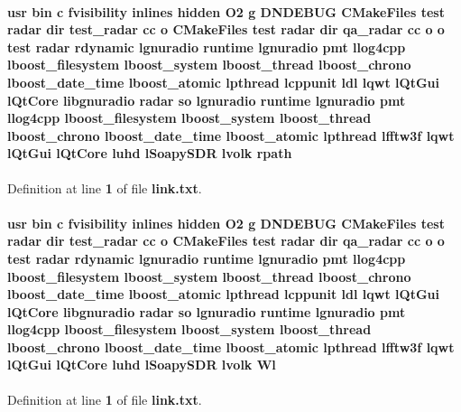 \paragraph[{rpath}]{\setlength{\rightskip}{0pt plus 5cm}usr bin {\bf c} fvisibility inlines hidden O2 g D\+N\+D\+E\+B\+UG C\+Make\+Files test {\bf radar} dir test\+\_\+radar cc o C\+Make\+Files test {\bf radar} dir {\bf qa\+\_\+radar} cc o o test {\bf radar} rdynamic lgnuradio {\bf runtime} lgnuradio {\bf pmt} llog4cpp lboost\+\_\+filesystem lboost\+\_\+system lboost\+\_\+thread lboost\+\_\+chrono lboost\+\_\+date\+\_\+time lboost\+\_\+atomic lpthread lcppunit ldl lqwt l\+Qt\+Gui l\+Qt\+Core libgnuradio {\bf radar} {\bf so} lgnuradio {\bf runtime} lgnuradio {\bf pmt} llog4cpp lboost\+\_\+filesystem lboost\+\_\+system lboost\+\_\+thread lboost\+\_\+chrono lboost\+\_\+date\+\_\+time lboost\+\_\+atomic lpthread lfftw3f lqwt l\+Qt\+Gui l\+Qt\+Core {\bf luhd} l\+Soapy\+S\+DR lvolk rpath}\label{gr-radar-dev_2build_2lib_2CMakeFiles_2test-radar_8dir_2link_8txt_a13393bd62b0fcf4b66fe2ea00b1e6f64}


Definition at line {\bf 1} of file {\bf link.\+txt}.

\paragraph[{Wl}]{\setlength{\rightskip}{0pt plus 5cm}usr bin {\bf c} fvisibility inlines hidden O2 g D\+N\+D\+E\+B\+UG C\+Make\+Files test {\bf radar} dir test\+\_\+radar cc o C\+Make\+Files test {\bf radar} dir {\bf qa\+\_\+radar} cc o o test {\bf radar} rdynamic lgnuradio {\bf runtime} lgnuradio {\bf pmt} llog4cpp lboost\+\_\+filesystem lboost\+\_\+system lboost\+\_\+thread lboost\+\_\+chrono lboost\+\_\+date\+\_\+time lboost\+\_\+atomic lpthread lcppunit ldl lqwt l\+Qt\+Gui l\+Qt\+Core libgnuradio {\bf radar} {\bf so} lgnuradio {\bf runtime} lgnuradio {\bf pmt} llog4cpp lboost\+\_\+filesystem lboost\+\_\+system lboost\+\_\+thread lboost\+\_\+chrono lboost\+\_\+date\+\_\+time lboost\+\_\+atomic lpthread lfftw3f lqwt l\+Qt\+Gui l\+Qt\+Core {\bf luhd} l\+Soapy\+S\+DR lvolk Wl}\label{gr-radar-dev_2build_2lib_2CMakeFiles_2test-radar_8dir_2link_8txt_acb47ddd66765cb276ef53a7a09f90981}


Definition at line {\bf 1} of file {\bf link.\+txt}.

